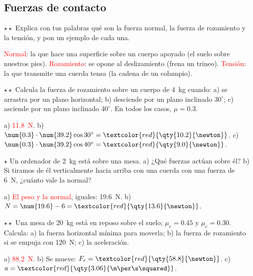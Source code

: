 \subsection{Fuerzas de contacto}

\begin{exercise}
    \(\star\star\) Explica con tus palabras qué son la fuerza normal, la fuerza de rozamiento y la tensión, y pon un ejemplo de cada una.
    \begin{solu}
        \textcolor{red}{Normal}: la que hace una superficie sobre un cuerpo apoyado (el suelo sobre nuestros pies). \textcolor{red}{Rozamiento}:
        se opone al deslizamiento (frena un trineo). \textcolor{red}{Tensión}: la que transmite una cuerda tensa (la cadena de un columpio).
    \end{solu}
\end{exercise}

\begin{exercise}
    \(\star\star\) Calcula la fuerza de rozamiento sobre un cuerpo de \qty{4}{\kg} cuando: a) se arrastra por un plano horizontal;
    b) desciende por un plano inclinado \(30^\circ\); c) asciende por un plano inclinado \(40^\circ\). En todos los casos, \(\mu = \num{0.3}\).
    \begin{solu}
        a) \textcolor{red}{\qty{11.8}{\newton}}. b) \(\num{0.3} \cdot \num{39.2}\cos 30^\circ = \textcolor{red}{\qty{10.2}{\newton}}\).
        c) \(\num{0.3} \cdot \num{39.2}\cos 40^\circ = \textcolor{red}{\qty{9.0}{\newton}}\).
    \end{solu}
\end{exercise}

\begin{exercise}
    \(\star\) Un ordenador de \qty{2}{\kg} está sobre una mesa. a) ¿Qué fuerzas actúan sobre él? b) Si tiramos de él verticalmente
    hacia arriba con una cuerda con una fuerza de \qty{6}{\newton}, ¿cuánto vale la normal?
    \begin{solu}
        a) \textcolor{red}{El peso y la normal}, iguales: \qty{19.6}{\newton}. b) \(N = \num{19.6} - 6 = \textcolor{red}{\qty{13.6}{\newton}}\).
    \end{solu}
\end{exercise}

\begin{exercise}
    \(\star\star\) Una mesa de \qty{20}{\kg} está en reposo sobre el suelo; \(\mu_e = \num{0.45}\) y \(\mu_c = \num{0.30}\). Calcula:
    a) la fuerza horizontal mínima para moverla; b) la fuerza de rozamiento si se empuja con \qty{120}{\newton}; c) la aceleración.
    \begin{solu}
        a) \textcolor{red}{\qty{88.2}{\newton}}. b) Se mueve: \(F_r = \textcolor{red}{\qty{58.8}{\newton}}\). c) \(a = \textcolor{red}{\qty{3.06}{\m\per\s\squared}}\).
    \end{solu}
\end{exercise}

